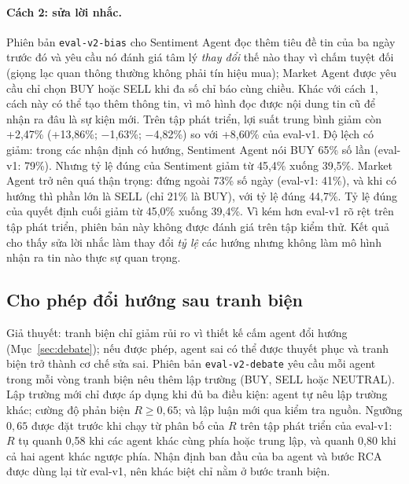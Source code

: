 \paragraph{Cách 2: sửa lời nhắc.} Phiên bản \texttt{eval-v2-bias} cho Sentiment Agent đọc thêm tiêu đề tin của ba ngày
trước đó và yêu cầu nó đánh giá tâm lý \emph{thay đổi} thế nào thay vì chấm tuyệt đối (giọng lạc quan thông thường không
phải tín hiệu mua); Market Agent được yêu cầu chỉ chọn BUY hoặc SELL khi đa số chỉ báo cùng chiều. Khác với cách 1, cách
này có thể tạo thêm thông tin, vì mô hình đọc được nội dung tin cũ để nhận ra đâu là sự kiện mới.
Trên tập phát triển, lợi suất trung bình giảm còn +2,47\% (+13,86\%; $-$1,63\%; $-$4,82\%) so với +8,60\% của eval-v1.
Độ lệch có giảm: trong các nhận định có hướng, Sentiment Agent nói BUY 65\% số lần (eval-v1: 79\%). Nhưng tỷ lệ đúng của
Sentiment giảm từ 45,4\% xuống 39,5\%. Market Agent trở nên quá thận trọng: đứng ngoài 73\% số ngày (eval-v1: 41\%), và
khi có hướng thì phần lớn là SELL (chỉ 21\% là BUY), với tỷ lệ đúng 44,7\%. Tỷ lệ đúng của quyết định cuối giảm từ 45,0\%
xuống 39,4\%. Vì kém hơn eval-v1 rõ rệt trên tập phát triển, phiên bản này không được đánh giá trên tập kiểm thử. Kết quả
cho thấy sửa lời nhắc làm thay đổi \emph{tỷ lệ} các hướng nhưng không làm mô hình nhận ra tin nào thực sự quan trọng.

\subsection{Cho phép đổi hướng sau tranh biện}
\label{sec:debate-flip}
Giả thuyết: tranh biện chỉ giảm rủi ro vì thiết kế cấm agent đổi hướng (Mục~\ref{sec:debate}); nếu được phép, agent sai
có thể được thuyết phục và tranh biện trở thành cơ chế sửa sai. Phiên bản \texttt{eval-v2-debate} yêu cầu mỗi agent
trong mỗi vòng tranh biện nêu thêm lập trường (BUY, SELL hoặc NEUTRAL). Lập trường mới chỉ được áp dụng khi đủ ba điều
kiện: agent tự nêu lập trường khác; cường độ phản biện $R\ge0{,}65$; và lập luận mới qua kiểm tra nguồn. Ngưỡng
$0{,}65$ được đặt trước khi chạy từ phân bố của $R$ trên tập phát triển của eval-v1: $R$ tụ quanh 0,58 khi các agent
khác cùng phía hoặc trung lập, và quanh 0,80 khi cả hai agent khác ngược phía. Nhận định ban đầu của ba agent và bước
RCA được dùng lại từ eval-v1, nên khác biệt chỉ nằm ở bước tranh biện.

